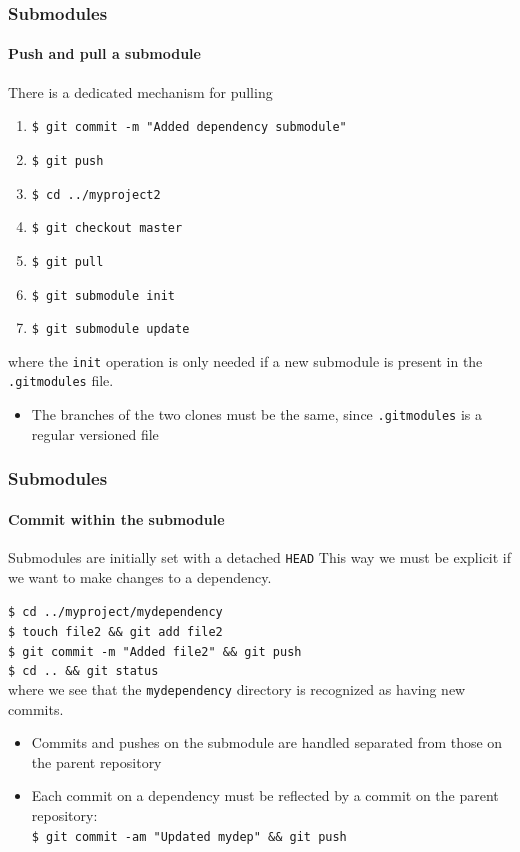 \begin{frame}
\frametitle{Submodules}
\framesubtitle{Push and pull a submodule}

\begin{block}{There is a dedicated mechanism for pulling}
\begin{enumerate}
\item \texttt{\$ git commit -m "Added dependency submodule"}
\item \texttt{\$ git push}
\item \texttt{\$ cd ../myproject2}
\item \texttt{\$ git checkout master}
\item \texttt{\$ git pull}
\item \texttt{\$ git submodule init}
\item \texttt{\$ git submodule update}
\end{enumerate}
where the \texttt{init} operation is only needed if a new submodule is present in the \texttt{.gitmodules} file.
\begin{itemize}
\item The branches of the two clones must be the same, since \texttt{.gitmodules} is a regular versioned file
\end{itemize}
\end{block}
\end{frame}

\begin{frame}
\frametitle{Submodules}
\framesubtitle{Commit within the submodule}

\begin{block}{Submodules are initially set with a detached \texttt{HEAD}}
This way we must be explicit if we want to make changes to a dependency.

\medskip
\texttt{\$ cd ../myproject/mydependency} \\
\texttt{\$ touch file2 \&\& git add file2} \\
\texttt{\$ git commit -m "Added file2" \&\& git push} \\
\texttt{\$ cd .. \&\& git status} \\

\medskip
where we see that the \texttt{mydependency} directory is recognized as having new commits.
\begin{itemize}
\item Commits and pushes on the submodule are handled separated from those on the parent repository
\item Each commit on a dependency must be reflected by a commit on the parent repository: \\
\texttt{\$ git commit -am "Updated mydep" \&\& git push} \\
\end{itemize}
\end{block}

\end{frame}


